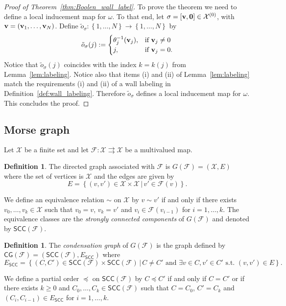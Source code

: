 \documentclass[12pt, notitlepage]{amsart}
\newcommand{\setof}[1]{\left\{ {#1}\right\}}
\newcommand{\setdef}[2]{\left\{{#1}\,\left|\,{#2}\right.\right\}}
\newcommand{\bv}{{\bf v}}
\newcommand{\cF}{{\mathcal F}}
\newcommand{\cX}{{\mathcal X}}
\theoremstyle{definition}
\newtheorem{defn}[thm]{Definition}
\newcommand{\CG}{\mathsf{CG}}
\newcommand{\SCC}{\mathsf{SCC}}
\begin{document}
  \begin{proof}[Proof of Theorem~\ref{thm:Boolen_wall_label}]
    To prove the theorem we need to define a local inducement map for $\omega$. To that end, let $\sigma = [\bv, {\bf 0}] \in \cX^{(0)}$, with $\bv = (\bv_1, \ldots, \bv_N)$. Define $\tilde{o}_{\sigma} \colon \setof{1, \ldots, N} \to \setof{1,\ldots, N}$ by
    \[
      \tilde{o}_{\sigma}(j) :=
      \begin{cases}
        \theta^{-1}_j(\bv_j), & \text{if } \bv_j \neq 0 \\
        j,                    & \text{if } \bv_j = 0.
      \end{cases}
    \]
    Notice that $\tilde{o}_{\sigma}(j)$ coincides with the index $k = k(j)$ from Lemma~\ref{lem:labeling}. Notice also that items (i) and (ii) of Lemma~\ref{lem:labeling} match the requirements (i) and (ii) of a wall labeling in Definition~\ref{def:wall_labeling}. Therefore $\tilde{o}_{\sigma}$ defines a local inducement map for $\omega$. This concludes the proof.
  \end{proof}

  \subsection{Morse graph}
  \label{sec:Morse_graph}

  Let $\cX$ be a finite set and let $\cF \colon \cX \rightrightarrows \cX$ be a multivalued map.

  \begin{defn}
    The directed graph associated with $\cF$ is $G(\cF) = (\cX,E)$ where the set of vertices is $\cX$ and the edges are given by
    \[
      E = \setdef{ (v,v') \in \cX \times \cX }{ v' \in \cF(v) }.
    \]
  \end{defn}

  We define an equivalence relation $\sim$ on $\cX$ by $v \sim v'$ if and only if there exists $v_0, \ldots, v_k \in \cX$ such that $v_0 = v$, $v_k = v'$ and $v_{i} \in \cF(v_{i-1})$ for $i=1,\ldots,k$. The equivalence classes are the \emph{strongly connected components} of $G(\cF)$ and denoted by $\SCC(\cF)$.

  \begin{defn}
    The \emph{condensation graph} of $G(\cF)$ is the graph defined by $\CG(\cF)=(\SCC(\cF),E_{\SCC})$ where
    \[
      E_{\SCC} = \setdef{ (C, C') \in \SCC(\cF) \times \SCC(\cF)}{C \neq C' \text{ and } \exists v \in C, v'\in C' \text{ s.t. } (v,v') \in E }.
    \]
  \end{defn}
  We define a partial order $\preceq$ on $\SCC(\cF)$ by $C \preceq C'$ if and only if $C = C'$ or if there exists $k\geq 0$ and $C_0,\ldots,C_k \in \SCC(\cF)$ such that $C=C_0$, $C'=C_k$ and $(C_i,C_{i-1}) \in E_{\SCC}$ for $i=1,\ldots,k$.
\end{document}
